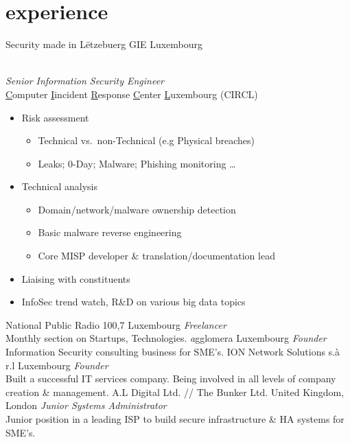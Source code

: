 \documentclass[a4paper]{friggeri-cv} %
\begin{document}
\section{experience}
\begin{entrylist}
{Security made in L\"{e}tzebuerg GIE}
{Luxembourg}
{\\
\emph{Senior Information Security Engineer} \\
\underline{C}omputer \underline{I}incident \underline{R}esponse \underline{C}enter \underline{L}uxembourg (CIRCL)
\begin{itemize}
    \item Risk assessment
    \begin{itemize}
        \item Technical vs.\ non-Technical (e.g Physical breaches)
        \item Leaks; 0-Day; Malware; Phishing monitoring \ldots
    \end{itemize}
    \item Technical analysis
    \begin{itemize}
        \item Domain/network/malware ownership detection
        \item Basic malware reverse engineering
        \item Core MISP developer \& translation/documentation lead
    \end{itemize}
    \item Liaising with constituents
    \item InfoSec trend watch, R\&D on various big data topics
\end{itemize}
}
{National Public Radio 100,7}
{Luxembourg}
{\emph{Freelancer}\\
Monthly section on Startups, Technologies.}
{\emph{a}gglomera}
{Luxembourg}
{\emph{Founder}\\
Information Security consulting business for SME's.}
{ION Network Solutions s.\`{a} r.l}
{Luxembourg}
{\emph{Founder} \\
Built a successful IT services company. Being involved in all levels of company creation \& management.}
{A.L Digital Ltd. // The Bunker Ltd.}
{United Kingdom, London}
{\emph{Junior Systems Administrator} \\
Junior position in a leading ISP to build secure infrastructure \& HA systems for SME's.}
\end{entrylist}
\end{document}

